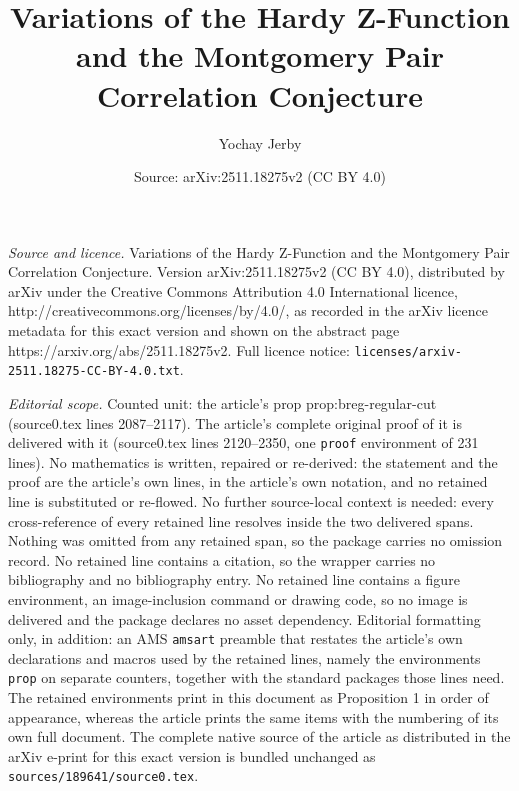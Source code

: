 \documentclass[10pt,a4paper]{amsart}
\title{Variations of the Hardy Z-Function and the Montgomery Pair Correlation Conjecture}
\author{Yochay Jerby}
\date{Source: arXiv:2511.18275v2 (CC BY 4.0)}
\begin{document}
\maketitle

\noindent\emph{Source and licence.} Variations of the Hardy Z-Function and the Montgomery Pair Correlation Conjecture. Version arXiv:2511.18275v2 (CC BY 4.0), distributed by arXiv under the Creative Commons Attribution 4.0 International licence, http://creativecommons.org/licenses/by/4.0/, as recorded in the arXiv licence metadata for this exact version and shown on the abstract page https://arxiv.org/abs/2511.18275v2. Full licence notice: \texttt{licenses/arxiv-2511.18275-CC-BY-4.0.txt}.\par\smallskip

\noindent\textit{Editorial scope.} Counted unit: the article's prop prop:breg-regular-cut (source0.tex lines 2087--2117). The article's complete original proof of it is delivered with it (source0.tex lines 2120--2350, one \texttt{proof} environment of 231 lines). No mathematics is written, repaired or re-derived: the statement and the proof are the article's own lines, in the article's own notation, and no retained line is substituted or re-flowed.  No further source-local context is needed: every cross-reference of every retained line resolves inside the two delivered spans.  Nothing was omitted from any retained span, so the package carries no omission record.  No retained line contains a citation, so the wrapper carries no bibliography and no bibliography entry.  No retained line contains a figure environment, an image-inclusion command or drawing code, so no image is delivered and the package declares no asset dependency.  Editorial formatting only, in addition: an AMS \texttt{amsart} preamble that restates the article's own declarations and macros used by the retained lines, namely the environments \texttt{prop} on separate counters, together with the standard packages those lines need.  The retained environments print in this document as Proposition 1 in order of appearance, whereas the article prints the same items with the numbering of its own full document.  The complete native source of the article as distributed in the arXiv e-print for this exact version is bundled unchanged as \texttt{sources/189641/source0.tex}.
\end{document}

